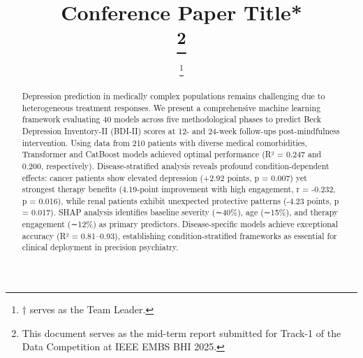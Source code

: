 \documentclass[conference]{IEEEtran}
\begin{document}
\title{Conference Paper Title*\\

\thanks{This document serves as the mid-term report submitted for Track-1 of the Data Competition at IEEE EMBS BHI 2025.}
}

\author{
\and
{}
\and
{}
\thanks{† serves as the Team Leader.}
}

\maketitle


\begin{abstract}
Depression prediction in medically complex populations remains challenging due to heterogeneous treatment responses. We present a comprehensive machine learning framework evaluating 40 models across five methodological phases to predict Beck Depression Inventory-II (BDI-II) scores at 12- and 24-week follow-ups post-mindfulness intervention. Using data from 210 patients with diverse medical comorbidities, Transformer and CatBoost models achieved optimal performance (R² = 0.247 and 0.200, respectively). Disease-stratified analysis reveals profound condition-dependent effects: cancer patients show elevated depression (+2.92 points, p = 0.007) yet strongest therapy benefits (4.19-point improvement with high engagement, r = -0.232, p = 0.016), while renal patients exhibit unexpected protective patterns (-4.23 points, p = 0.017). SHAP analysis identifies baseline severity (∼40\%), age (∼15\%), and therapy engagement (∼12\%) as primary predictors. Disease-specific models achieve exceptional accuracy (R² = 0.81–0.93), establishing condition-stratified frameworks as essential for clinical deployment in precision psychiatry.
\end{abstract}
\end{document}
